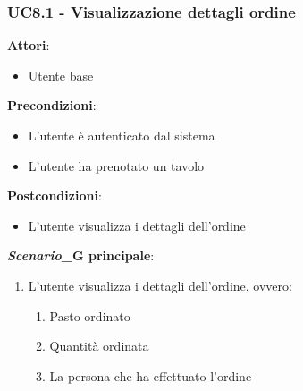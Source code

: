 \subsubsection{UC8.1 - Visualizzazione dettagli ordine}\label{usecase:8_1}
\textbf{Attori}:
\begin{itemize}
    \item Utente base
\end{itemize}
\textbf{Precondizioni}:
\begin{itemize}
    \item L'utente è autenticato dal sistema
    \item L'utente ha prenotato un tavolo
\end{itemize}
\textbf{Postcondizioni}:
\begin{itemize}
    \item L'utente visualizza i dettagli dell'ordine
\end{itemize}
\textbf{\textit{Scenario}_G principale}:
\begin{enumerate}
    \item L'utente visualizza i dettagli dell'ordine, ovvero:
    \begin{enumerate}
        \item Pasto ordinato
        \item Quantità ordinata
        \item La persona che ha effettuato l'ordine
    \end{enumerate}
\end{enumerate}
\newpage